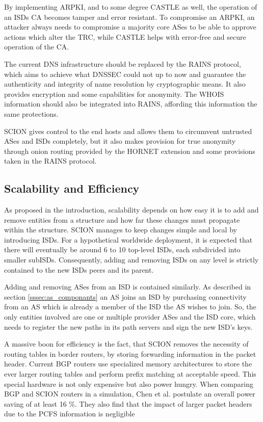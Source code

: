 \documentclass[../eva1_scion.tex]{subfiles}
\begin{document}
    By implementing ARPKI, and to some degree CASTLE as well, the operation of an ISDs CA becomes tamper and error resistant. To compromise an ARPKI, an attacker always needs to compromise a majority core ASes to be able to approve actions which alter the TRC, while CASTLE helps with error-free and secure operation of the CA.

    The current DNS infrastructure should be replaced by the RAINS protocol, which aims to achieve what DNSSEC could not up to now and guarantee the authenticity and integrity of name resolution by cryptographic means. It also provides encryption and some capabilities for anonymity. The WHOIS information should also be integrated into RAINS, affording this information the same protections.

    SCION gives control to the end hosts and allows them to circumvent untrusted ASes and ISDs completely, but it also makes provision for true anonymity through onion routing provided by the HORNET extension and some provisions taken in the RAINS protocol.

    \subsection{Scalability and Efficiency}
    As proposed in the introduction, scalability depends on how easy it is to add and remove entities from a structure and how far these changes must propagate within the structure. SCION manages to keep changes simple and local by introducing ISDs. For a hypothetical worldwide deployment, it is expected that there will eventually be around 6 to 10 \cite{scion_2011} top-level ISDs, each subdivided into smaller subISDs. Consequently, adding and removing ISDs on any level is strictly contained to the new ISDs peers and its parent.

    Adding and removing ASes from an ISD is contained similarly. As described in section \ref{sssec:as_componants} an AS joins an ISD by purchasing connectivity from an AS which is already a member of the ISD the AS wishes to join. So, the only entities involved are one or multiple provider ASes and the ISD core, which needs to register the new paths in its path servers and sign the new ISD's keys.

    A massive boon for efficiency is the fact, that SCION removes the necessity of routing tables in border routers, by storing forwarding information in the packet header. Current BGP routers use specialized memory architectures to store the ever larger routing tables and perform prefix matching at acceptable speed. This special hardware is not only expensive but also power hungry. When comparing BGP and SCION routers in a simulation, Chen et al. postulate an overall power saving of at least 16 \%. They also find that the impact of larger packet headers due to the PCFS information is negligible \cite{scion_power}
\end{document}
